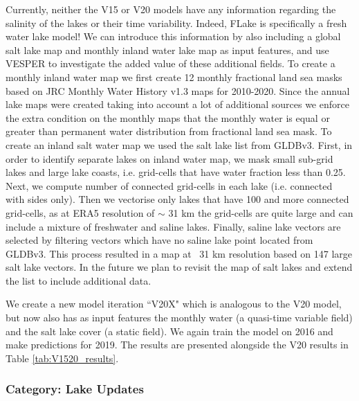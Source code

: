 \documentclass[twocolumn]{article}
\begin{document}
	
	\noindent Currently, neither the V15 or V20 models have any information regarding the salinity of the lakes or their time variability. Indeed, FLake is specifically a fresh water lake model! We can introduce this information by also including a global salt lake map and monthly inland water lake map as input features,  and use VESPER to investigate the added value of these additional fields.  To create a monthly inland water map we first create 12 monthly fractional land sea masks based on JRC Monthly Water History v1.3 maps for 2010-2020. Since the annual lake maps were created taking into account a lot of additional sources we enforce the extra condition on the monthly maps that the monthly water is equal or greater than permanent water distribution from fractional land sea mask. To create an inland salt water map we used the salt lake list from GLDBv3. First, in order to identify separate lakes on inland water map, we mask small sub-grid lakes and large lake coasts, i.e. grid-cells that have water fraction less than 0.25. Next, we compute number of connected grid-cells in each lake (i.e. connected with sides only). Then we vectorise only lakes that have 100 and more connected grid-cells, as at ERA5 resolution of $\sim$ 31 km the grid-cells are quite large and can include a mixture of freshwater and saline lakes. Finally, saline lake vectors are selected by filtering vectors which have no saline lake point located from GLDBv3. This process resulted in a map at ~31 km resolution based on 147 large salt lake vectors. In the future we plan to revisit the map of salt lakes and extend the list to include additional data. \newline 
	
	
	
	\noindent We create a new model iteration ``V20X" which is analogous to the V20 model, but now also has as input features the monthly water (a quasi-time variable field) and the salt lake cover (a static field). We again train the model on 2016 and make predictions for 2019. The results are presented alongside the V20 results in Table \ref{tab:V1520_results}. \newline 
	
	\subsubsection{Category: Lake Updates}\label{V20XLake}
	
\end{document}
